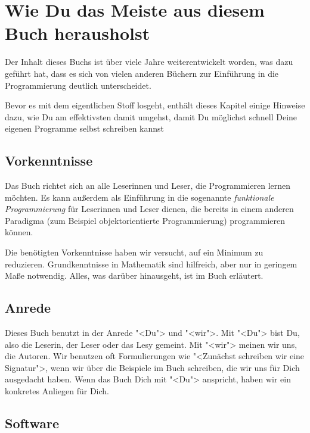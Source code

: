 
\setcounter{chapter}{-1}
\chapter{Wie Du das Meiste aus diesem Buch herausholst}

Der Inhalt dieses Buchs ist über viele Jahre weiterentwickelt worden,
was dazu geführt hat, dass es sich von vielen anderen Büchern zur
Einführung in die Programmierung deutlich unterscheidet.

Bevor es mit dem eigentlichen Stoff losgeht, enthält dieses Kapitel
einige Hinweise dazu, wie Du am effektivsten damit umgehst, damit Du
möglichst schnell Deine eigenen Programme selbst schreiben kannst

\section{Vorkenntnisse}

Das Buch richtet sich an alle Leserinnen und Leser, die Programmieren
lernen möchten.  Es kann außerdem als Einführung in die sogenannte
\textit{funktionale Programmierung} für Leserinnen und Leser dienen,
die bereits in einem anderen Paradigma (zum Beispiel objektorientierte
Programmierung) programmieren können.

Die benötigten Vorkenntnisse haben wir versucht, auf ein Minimum zu
reduzieren.  Grundkenntnisse in Mathematik sind hilfreich, aber nur in
geringem Maße notwendig.  Alles, was darüber hinausgeht, ist im Buch
erläutert. 

\section{Anrede}

Dieses Buch benutzt in der Anrede "<Du"> und "<wir">.  Mit "<Du"> bist
Du, also die Leserin, der Leser oder das Lesy gemeint.  Mit "<wir"> meinen wir
uns, die Autoren.  Wir benutzen oft Formulierungen wie "<Zunächst
schreiben wir eine Signatur">, wenn wir über die Beispiele im Buch
schreiben, die wir uns für Dich ausgedacht haben.  Wenn das Buch Dich
mit "<Du"> anspricht, haben wir ein konkretes Anliegen für Dich.

\section{Software}
\label{sec:racket}

